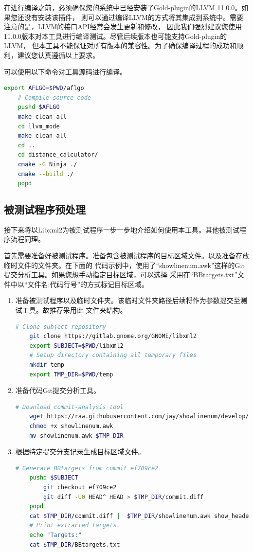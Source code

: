 \documentclass[bachelor]{njupthesis}
\begin{document}
在进行编译之前，必须确保您的系统中已经安装了Gold-plugin的LLVM 11.0.0。如果您还没有安装该插件，
则可以通过编译LLVM的方式将其集成到系统中。需要注意的是，LLVM的接口API经常会发生更新和修改，
因此我们强烈建议您使用11.0.0版本对本工具进行编译测试。尽管后续版本也可能支持Gold-plugin的LLVM，
但本工具不能保证对所有版本的兼容性。为了确保编译过程的成功和顺利，建议您认真遵循以上要求。

可以使用以下命令对工具源码进行编译。
\begin{lstlisting}[language=bash]
	export AFLGO=$PWD/aflgo
	# Compile source code
	pushd $AFLGO
	make clean all 
	cd llvm_mode
	make clean all
	cd ..
	cd distance_calculator/
	cmake -G Ninja ./
	cmake --build ./
	popd
\end{lstlisting}
\subsection{被测试程序预处理}
接下来将以Libxml2为被测试程序一步一步地介绍如何使用本工具。其他被测试程序流程同理。

首先需要准备好被测试程序。准备包含被测试程序的目标区域文件。以及准备存放临时文件的文件夹。在下面的
代码示例中，使用了“showlinenum.awk”这样的Git提交分析工具。如果您想手动指定目标区域，可以选择
采用在“BBtargets.txt”文件中以“文件名:代码行号”的方式标记目标区域。

\begin{enumerate}[label=(\arabic*),leftmargin=24pt]
	\item 准备被测试程序以及临时文件夹。该临时文件夹路径后续将作为参数提交至测试工具。故推荐采用此
	文件夹结构。
	\begin{lstlisting}[language=bash,xleftmargin=-24pt]
	# Clone subject repository
	git clone https://gitlab.gnome.org/GNOME/libxml2
	export SUBJECT=$PWD/libxml2
	# Setup directory containing all temporary files
	mkdir temp
	export TMP_DIR=$PWD/temp
	\end{lstlisting}
	\item 准备代码Git提交分析工具。
	\begin{lstlisting}[language=bash,xleftmargin=-24pt]
	# Download commit-analysis tool
	wget https://raw.githubusercontent.com/jay/showlinenum/develop/showlinenum.awk
	chmod +x showlinenum.awk
	mv showlinenum.awk $TMP_DIR
	\end{lstlisting}
	\item 根据特定提交分支记录生成目标区域文件。
	\begin{lstlisting}[language=bash,xleftmargin=-24pt]
	# Generate BBtargets from commit ef709ce2
	pushd $SUBJECT
		git checkout ef709ce2
		git diff -U0 HEAD^ HEAD > $TMP_DIR/commit.diff
	popd
	cat $TMP_DIR/commit.diff |  $TMP_DIR/showlinenum.awk show_header=0 path=1 | grep -e "\.[ch]:[0-9]*:+" -e "\.cpp:[0-9]*:+" -e "\.cc:[0-9]*:+" | cut -d+ -f1 | rev | cut -c2- | rev > $TMP_DIR/BBtargets.txt
	# Print extracted targets. 
	echo "Targets:"
	cat $TMP_DIR/BBtargets.txt
	\end{lstlisting}
\end{enumerate}
\end{document}
